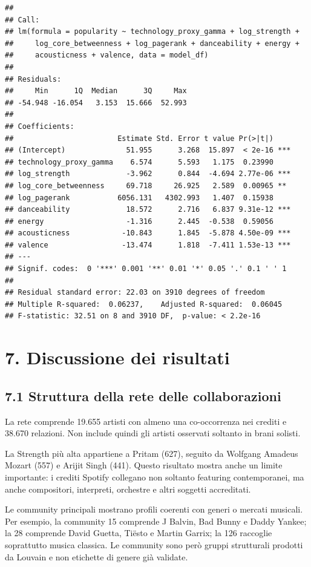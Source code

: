 \documentclass[
]{article}
\begin{document}
\begin{verbatim}
## 
## Call:
## lm(formula = popularity ~ technology_proxy_gamma + log_strength + 
##     log_core_betweenness + log_pagerank + danceability + energy + 
##     acousticness + valence, data = model_df)
## 
## Residuals:
##     Min      1Q  Median      3Q     Max 
## -54.948 -16.054   3.153  15.666  52.993 
## 
## Coefficients:
##                        Estimate Std. Error t value Pr(>|t|)    
## (Intercept)              51.955      3.268  15.897  < 2e-16 ***
## technology_proxy_gamma    6.574      5.593   1.175  0.23990    
## log_strength             -3.962      0.844  -4.694 2.77e-06 ***
## log_core_betweenness     69.718     26.925   2.589  0.00965 ** 
## log_pagerank           6056.131   4302.993   1.407  0.15938    
## danceability             18.572      2.716   6.837 9.31e-12 ***
## energy                   -1.316      2.445  -0.538  0.59056    
## acousticness            -10.843      1.845  -5.878 4.50e-09 ***
## valence                 -13.474      1.818  -7.411 1.53e-13 ***
## ---
## Signif. codes:  0 '***' 0.001 '**' 0.01 '*' 0.05 '.' 0.1 ' ' 1
## 
## Residual standard error: 22.03 on 3910 degrees of freedom
## Multiple R-squared:  0.06237,    Adjusted R-squared:  0.06045 
## F-statistic: 32.51 on 8 and 3910 DF,  p-value: < 2.2e-16
\end{verbatim}

\section{7. Discussione dei risultati}\label{discussione-dei-risultati}

\subsection{7.1 Struttura della rete delle
collaborazioni}\label{struttura-della-rete-delle-collaborazioni}

La rete comprende 19.655 artisti con almeno una co-occorrenza nei
crediti e 38.670 relazioni. Non include quindi gli artisti osservati
soltanto in brani solisti.

La Strength più alta appartiene a Pritam (627), seguito da Wolfgang
Amadeus Mozart (557) e Arijit Singh (441). Questo risultato mostra anche
un limite importante: i crediti Spotify collegano non soltanto featuring
contemporanei, ma anche compositori, interpreti, orchestre e altri
soggetti accreditati.

Le community principali mostrano profili coerenti con generi o mercati
musicali. Per esempio, la community 15 comprende J Balvin, Bad Bunny e
Daddy Yankee; la 28 comprende David Guetta, Tiësto e Martin Garrix; la
126 raccoglie soprattutto musica classica. Le community sono però gruppi
strutturali prodotti da Louvain e non etichette di genere già validate.
\end{document}
